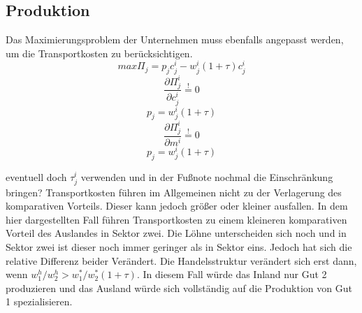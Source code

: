 \subsection{Produktion}
Das Maximierungsproblem der Unternehmen muss ebenfalls angepasst werden, um die Transportkosten zu ber{\"u}cksichtigen.
\begin{equation} max\Pi_j=p_jc^i_j-w^i_j (1+\tau) c^i_j\end{equation}
\begin{equation}\frac{\partial \Pi^i_j}{\partial c^i_j}\overset{!}{=}0\end{equation}
\begin{equation}p_j=w^i_j(1+\tau)\end{equation}
\begin{equation}\frac{\partial \Pi^i_j}{\partial m^i}\overset{!}{=}0\end{equation}
\begin{equation}p_j=w^i_j (1+\tau)\end{equation}
\begin{flushright}
\begin{center}
\end{center}
\end{flushright}
\textcolor[rgb]{1,0,0}{eventuell doch $\tau_j^i$ verwenden und in der Fu{\ss}note nochmal die Einschr{\"a}nkung bringen?}
Transportkosten f{\"u}hren im Allgemeinen nicht zu der Verlagerung des komparativen Vorteils. Dieser kann jedoch gr{\"o}{\ss}er oder kleiner ausfallen. In dem hier dargestellten Fall f{\"u}hren Transportkosten zu einem kleineren komparativen Vorteil des Auslandes in Sektor zwei. Die L{\"o}hne unterscheiden sich noch und in Sektor zwei ist dieser noch immer geringer als in Sektor eins. Jedoch hat sich die relative Differenz beider Ver{\"a}ndert. Die Handelsstruktur ver{\"a}ndert sich erst dann, wenn $w_1^h/w_2^h>w_1^*/w_2^*(1+\tau)$. In diesem Fall würde das Inland nur Gut 2 produzieren und das Ausland w{\"u}rde sich vollst{\"a}ndig auf die Produktion von Gut 1 spezialisieren.

